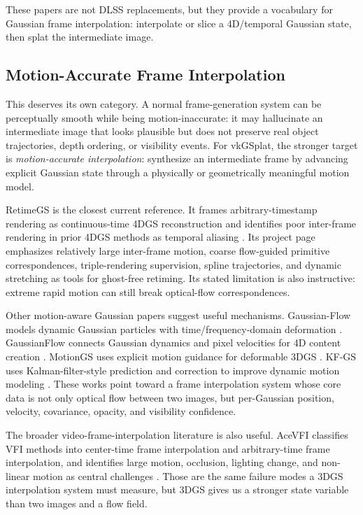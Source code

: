 \documentclass[11pt]{article}
\begin{document}
These papers are not DLSS replacements, but they provide a vocabulary for
Gaussian frame interpolation: interpolate or slice a 4D/temporal Gaussian
state, then splat the intermediate image.

\subsection{Motion-Accurate Frame Interpolation}

This deserves its own category. A normal frame-generation system can be
perceptually smooth while being motion-inaccurate: it may hallucinate an
intermediate image that looks plausible but does not preserve real object
trajectories, depth ordering, or visibility events. For vkGSplat, the stronger
target is \emph{motion-accurate interpolation}: synthesize an intermediate
frame by advancing explicit Gaussian state through a physically or
geometrically meaningful motion model.

RetimeGS is the closest current reference. It frames arbitrary-timestamp
rendering as continuous-time 4DGS reconstruction and identifies poor
inter-frame rendering in prior 4DGS methods as temporal aliasing
\cite{wang2026retimegs}. Its project page emphasizes relatively large
inter-frame motion, coarse flow-guided primitive correspondences,
triple-rendering supervision, spline trajectories, and dynamic stretching as
tools for ghost-free retiming. Its stated limitation is also instructive:
extreme rapid motion can still break optical-flow correspondences.

Other motion-aware Gaussian papers suggest useful mechanisms. Gaussian-Flow
models dynamic Gaussian particles with time/frequency-domain deformation
\cite{lin2023gaussianflow}. GaussianFlow connects Gaussian dynamics and pixel
velocities for 4D content creation \cite{gao2024gaussianflow}. MotionGS uses
explicit motion guidance for deformable 3DGS \cite{zhu2024motiongs}. KF-GS uses
Kalman-filter-style prediction and correction to improve dynamic motion
modeling \cite{liu2026kfgs}. These works point toward a frame interpolation
system whose core data is not only optical flow between two images, but
per-Gaussian position, velocity, covariance, opacity, and visibility confidence.

The broader video-frame-interpolation literature is also useful. AceVFI
classifies VFI methods into center-time frame interpolation and arbitrary-time
frame interpolation, and identifies large motion, occlusion, lighting change,
and non-linear motion as central challenges \cite{kye2026acevfi}. Those are the
same failure modes a 3DGS interpolation system must measure, but 3DGS gives us
a stronger state variable than two images and a flow field.
\end{document}
